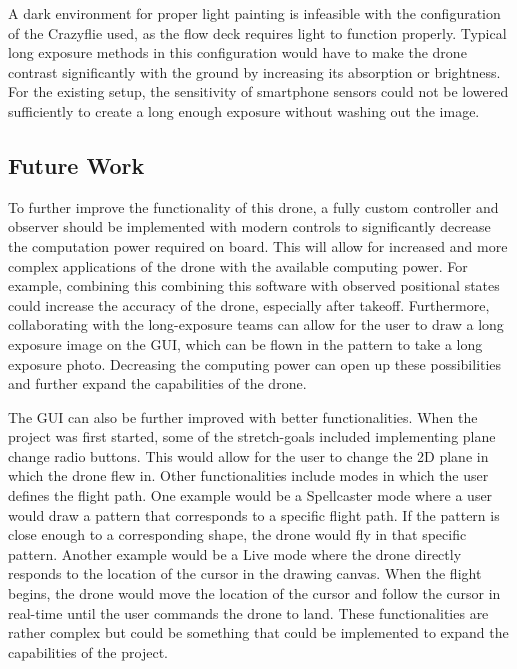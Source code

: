 \documentclass[conf]{new-aiaa}
\begin{document}
        A dark environment for proper light painting is infeasible with the configuration of the Crazyflie used, as the flow deck requires light to function properly. Typical long exposure methods in this configuration would have to make the drone contrast significantly with the ground by increasing its absorption or brightness. For the existing setup, the sensitivity of smartphone sensors could not be lowered sufficiently to create a long enough exposure without washing out the image.
        

    \subsection{Future Work}
    
        To further improve the functionality of this drone, a fully custom controller and observer should be implemented with modern controls to significantly decrease the computation power required on board. This will allow for increased and more complex applications of the drone with the available computing power. For example, combining this combining this software with observed positional states could increase the accuracy of the drone, especially after takeoff. Furthermore, collaborating with the long-exposure teams can allow for the user to draw a long exposure image on the GUI, which can be flown in the pattern to take a long exposure photo. Decreasing the computing power can open up these possibilities and further expand the capabilities of the drone. 
        
        The GUI can also be further improved with better functionalities. When the project was first started, some of the stretch-goals included implementing plane change radio buttons. This would allow for the user to change the 2D plane in which the drone flew in. Other functionalities include modes in which the user defines the flight path. One example would be a Spellcaster mode where a user would draw a pattern that corresponds to a specific flight path. If the pattern is close enough to a corresponding shape, the drone would fly in that specific pattern. Another example would be a Live mode where the drone directly responds to the location of the cursor in the drawing canvas. When the flight begins, the drone would move the location of the cursor and follow the cursor in real-time until the user commands the drone to land. These functionalities are rather complex but could be something that could be implemented to expand the capabilities of the project. 
        
\end{document}
